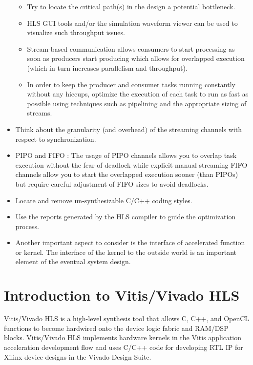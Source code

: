 \begin{itemize}
  \begin{itemize}
    \item Try to locate the critical path(s) in the design a potential bottleneck.  
    \item HLS GUI tools and/or the simulation waveform viewer can be used to visualize such throughput issues.
    \item Stream-based communication allows consumers to start processing as soon as producers start producing which allows for overlapped execution (which in turn increases parallelism
    and throughput).
    \item In order to keep the producer and consumer tasks running constantly without any hiccups, optimize the execution of each task to run as fast as possible using techniques such as
    pipelining and the appropriate sizing of streams.    
  \end{itemize}
  \item Think about the granularity (and overhead) of the streaming channels with respect to synchronization. 
  \item PIPO and FIFO : The usage of PIPO channels allows you to overlap task execution without the fear of deadlock while explicit manual streaming FIFO channels allow you to start the overlapped execution sooner (than PIPOs) but require careful adjustment of FIFO sizes to avoid deadlocks.
  \item Locate and remove un-synthesizable C/C++ coding styles.
  \item Use the reports generated by the HLS compiler to guide the optimization process. 
  \item Another important aspect to consider is the interface of accelerated function or kernel. The interface of the kernel to the outside world is an important element of the eventual system design.
\end{itemize}



\clearpage
\section{Introduction to Vitis/Vivado HLS}

Vitis/Vivado HLS is a high-level synthesis tool that allows C, C++, and OpenCL functions to become hardwired onto the device logic fabric and RAM/DSP blocks. Vitis/Vivado HLS implements hardware kernels in the Vitis application acceleration development flow and uses C/C++ code for developing RTL IP for Xilinx device designs in the Vivado Design Suite.

